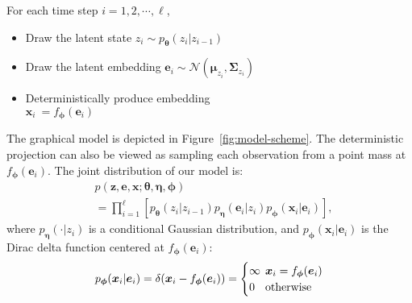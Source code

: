 \documentclass[11pt,a4paper]{article}
\begin{document}
\vspace{2mm}
\noindent For each time step $i = 1, 2, \cdots, \ell$,
\vspace{-2mm}
  \begin{itemize}[noitemsep, leftmargin=*]
   \item Draw the latent state ${z_i} \sim p_{\bm{\theta}}(z_i | z_{i-1})$ 
   \item Draw the latent embedding $\bm{e}_i \sim \mathcal{N}(\bm{\mu}_{z_i}, \bm{\Sigma}_{z_i})$
   \item Deterministically produce embedding \\$\bm{x}_i\ = f_{\bm{\phi}}(\bm{e}_i)$
  \end{itemize}
\vspace{0mm}

\noindent The graphical model is depicted in Figure~\ref{fig:model-scheme}. The deterministic projection can also be viewed as sampling each observation from a point mass at $f_{\bm{\phi}}(\bm{e}_i)$.
The joint distribution of our model is:
\begin{equation}
\label{eq:joint-prob}
\begin{split}
& p(\bm{z}, \bm{e}, \bm{x}; \bm{\theta}, \bm{\eta}, \bm{\phi}) \\
& = \prod\nolimits_{i=1}^\ell [p_{\bm{\theta}}(z_i | z_{i-1})p_{\bm{\eta}}(\bm{e}_i | z_i) p_{\bm{\phi}}(\bm{x}_i | \bm{e}_i)],
\end{split}
\end{equation}
where $p_{\bm{\eta}}(\cdot | z_i)$ is a conditional Gaussian distribution, and $p_{\bm{\phi}}(\bm{x}_i | \bm{e}_i)$ is the Dirac delta function centered at $f_{\bm{\phi}}(\bm{e}_i)$:
\begin{equation}
\label{eq:dirac}
p_{\bm{\phi}}(\bm{x}_i | \bm{e}_i) = \delta(\bm{x}_i-f_{\bm{\phi}}(\bm{e}_i)) = 
\begin{cases}
\infty & \hspace{-2mm}\bm{x}_i = f_{\bm{\phi}}(\bm{e}_i)\\
0 & \hspace{-2mm}\text{otherwise}
\end{cases}
\raisetag{10pt}
\end{equation}
\end{document}

